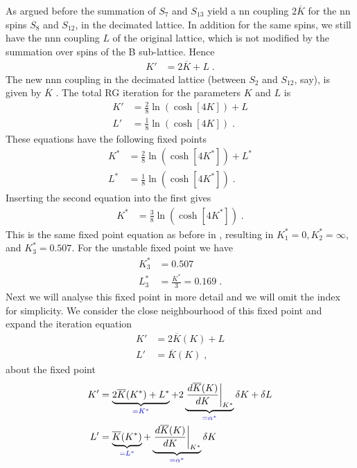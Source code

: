 As argued before the summation of $S_{7}$ and $S_{13}$ yield a nn 
coupling $2 \overline K$ for the nn spins $S_{8}$ and $S_{12}$, in the decimated lattice. In addition for the same spins, we still have the  nnn coupling $L$ of the original 
lattice, which is not modified by the summation over spins of the B sub-lattice.
Hence 
%
\begin{align}
K' &= 2 \overline K + L\;.
\end{align}
%
The  new nnn coupling in the decimated lattice (between $S_{2}$ and $S_{12}$, say),
is given by $\overline K$ 
. The total RG iteration for the parameters $K$ and $L$ is
%
\begin{align}\label{eq:RG:Ising:2D:b}
K' &= \frac{2}{8}\ln(\cosh[4K])    + L\\
L' &= \frac{1}{8}\ln(\cosh[4K])\;.
\end{align}
%
These equations have the following fixed points
\begin{align}\label{eq:RG:Ising:2D}
K^{*} &= \frac{2}{8}\ln(\cosh[4K^{*}])    + L^{*}\\
L^{*} &= \frac{1}{8}\ln(\cosh[4K^{*}])\;.
\end{align}
%
Inserting the second equation into the first gives
%
\begin{align*}
K^{*} &= \frac{3}{8}\ln(\cosh[4K^{*}])\;.
\end{align*}
%
This is the same fixed point equation as before in  , resulting in
$K_{1}^{*}=0, K_{2}^{*}=\infty$, and $K_{3}^{*}=0.507$.
For the unstable fixed point we have
%
\begin{align}
K^{*}_{3} &= 0.507\\
L^{*}_{3} &= \frac{K^{*}}{3} = 0.169\;.
\end{align}
%
Next we will analyse this fixed point in more detail and we will omit
the index for simplicity.
We consider the close neighbourhood of this fixed point and expand the iteration equation
%
\begin{align*}
K' &= 2 \overline K(K) + L\\
L' &= \overline K(K) \;,
\end{align*}
%
about the fixed point
%
\begin{align*}
K' &= 
\underbrace{2 \overline K(K^{*}) + L^{*}}_{\color{blue} = K^{*}} 
+ 2 \underbrace{
\eval{\frac{d \overline K(K)}{d K}}_{K^{*}}
}_{\color{blue} = \alpha^{*}}
\var  K
+ \var  L
\\
L' &= \underbrace{\overline K(K^{*})}_{\color{blue} = L^{*}} 
+ \underbrace{
\eval{\frac{d \overline K(K)}{d K}}_{K^{*}}
}_{\color{blue} = \alpha^{*}} \var  K
\end{align*}
